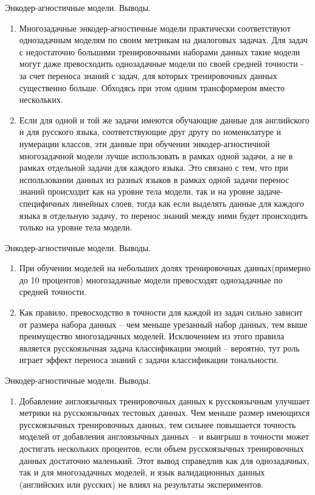 \begin{frame}{Энкодер-агностичные модели. Выводы.}
\begin{enumerate}
\item Многозадачные энкодер-агностичные модели практически соответствуют однозадачным моделям по своим метрикам на диалоговых задачах. Для задач с недостаточно большими тренировочными наборами данных такие модели могут даже превосходить однозадачные модели по своей средней точности - за счет переноса знаний с задач, для которых тренировочных данных существенно больше. Обходясь при этом одним трансформером вместо нескольких.
\item Если для одной и той же задачи имеются обучающие данные для английского и для русского языка, соответствующие друг другу по номенклатуре и нумерации классов, эти данные при обучении энкодер-агностичной многозадачной модели лучше использовать в рамках одной задачи, а не в рамках отдельной задачи для каждого языка. Это связано с тем, что при использовании данных из разных языков в рамках одной задачи перенос знаний происходит как на уровне тела модели, так и на уровне задаче-специфичных линейных слоев, тогда как если выделять данные для каждого языка в отдельную задачу, то перенос знаний между ними будет происходить только на уровне тела модели.
\end{enumerate}
\end{frame}
\begin{frame}{Энкодер-агностичные модели. Выводы.}
\begin{enumerate}
\item При обучении моделей на небольших долях тренировочных данных(примерно до 10 процентов) многозадачные модели превосходят однозадачные по средней точности.
\item Как правило, превосходство в точности для каждой из задач сильно зависит от размера набора данных -- чем меньше урезанный набор данных, тем выше преимущество многозадачных моделей. Исключением из этого правила является русскоязычная задача классификации эмоций -- вероятно, тут роль играет эффект переноса знаний с задачи классификации тональности.
\end{enumerate}
\end{frame}
\begin{frame}{Энкодер-агностичные модели. Выводы.}
\begin{enumerate}
\item Добавление англоязычных тренировочных данных к русскоязычным улучшает метрики на русскоязычных тестовых данных. Чем меньше размер имеющихся русскоязычных тренировочных данных, тем сильнее повышается точность моделей от добавления англоязычных данных -- и выигрыш в точности может достигать нескольких процентов, если объем русскоязычных тренировочных данных достаточно маленький. Этот вывод справедлив как для однозадачных, так и для многозадачных моделей, и язык валидационных данных (английских или русских) не влиял на результаты экспериментов.
\end{enumerate}
\end{frame}

